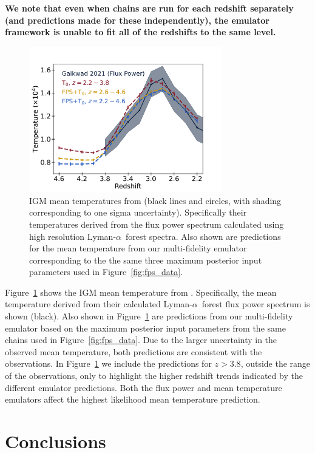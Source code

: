 \documentclass[a4paper,11pt]{article}
\newcommand{\lya}{Lyman-$\alpha$\ }
\begin{document}
\textbf{We note that even when chains are run for each redshift separately (and predictions made for these independently), the emulator framework is unable to fit all of the redshifts to the same level.}

\begin{figure}
    \centering
    \includegraphics[width=0.75\textwidth]{figures/temp_data_fit.pdf}
    \caption{\label{fig:temp_data}
    IGM mean temperatures from \cite{2021MNRAS.506.4389G} (black lines and circles, with shading corresponding to one sigma uncertainty).
    Specifically their temperatures derived from the flux power spectrum calculated using high resolution \lya forest spectra.
    Also shown are predictions for the mean temperature from our multi-fidelity emulator corresponding to the the same three maximum posterior input parameters used in Figure~\ref{fig:fps_data}.
    }
\end{figure}

Figure~\ref{fig:temp_data} shows the IGM mean temperature from \cite{2021MNRAS.506.4389G}.
Specifically, the mean temperature derived from their calculated \lya forest flux power spectrum is shown (black).
Also shown in Figure~\ref{fig:temp_data} are predictions from our multi-fidelity emulator based on the maximum posterior input parameters from the same chains used in Figure~\ref{fig:fps_data}.
Due to the larger uncertainty in the observed mean temperature, both predictions are consistent with the observations.
In Figure~\ref{fig:temp_data} we include the predictions for $z>3.8$, outside the range of the observations, only to highlight the higher redshift trends indicated by the different emulator predictions.
Both the flux power and mean temperature emulators affect the highest likelihood mean temperature prediction.

\section{Conclusions}\label{sec:conclusions}
\end{document}
